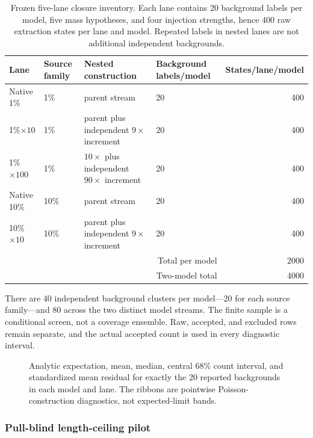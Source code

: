 \begin{table}[htbp]
\centering
\caption{Frozen five-lane closure inventory.  Each lane contains 20 background
labels per model, five mass hypotheses, and four injection strengths, hence 400
raw extraction states per lane and model.  Repeated labels in nested lanes are
not additional independent backgrounds.}
\label{tab:v4p8p3-five-lane-inventory}
\begin{tabular}{llllr}
\hline
Lane & Source family & Nested construction & Background labels/model & States/lane/model \\
\hline
Native 1\%    & 1\%  & parent stream                         & 20 & 400 \\
1\%$\times10$ & 1\%  & parent plus independent $9\times$ increment  & 20 & 400 \\
1\%$\times100$& 1\%  & $10\times$ plus independent $90\times$ increment & 20 & 400 \\
Native 10\%   & 10\% & parent stream                         & 20 & 400 \\
10\%$\times10$& 10\% & parent plus independent $9\times$ increment & 20 & 400 \\
\hline
\multicolumn{4}{r}{Total per model} & 2000 \\
\multicolumn{4}{r}{Two-model total} & 4000 \\
\hline
\end{tabular}
\end{table}

There are 40 independent background clusters per model---20 for each source
family---and 80 across the two distinct model streams.  The finite sample is a
conditional screen, not a coverage ensemble.  Raw, accepted, and excluded rows
remain separate, and the actual accepted count is used in every diagnostic
interval.

\begin{figure}[htbp]
\centering
{}
\caption{Analytic expectation, mean,
median, central 68\% count interval, and standardized mean residual for exactly
the 20 reported backgrounds in each model and lane.  The ribbons are
pointwise Poisson-construction diagnostics, not expected-limit bands.}
\label{fig:v4p8p3-five-lane-sampling}
\end{figure}

\subsubsection{Pull-blind length-ceiling pilot}

